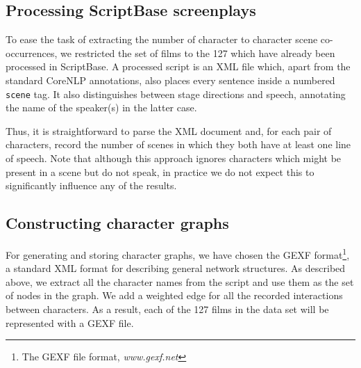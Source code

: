 \documentclass[bsc,frontabs,singlespacing,parskip, twoside]{infthesis}
\begin{document}
\subsection{Processing ScriptBase screenplays}
To ease the task of extracting the number of character to character scene co-occurrences, we restricted the set of films to the 127 which have already been processed in ScriptBase. A processed script is an XML file which, apart from the standard CoreNLP annotations, also places every sentence inside a numbered \texttt{scene} tag. It also distinguishes between stage directions and speech, annotating the name of the speaker(s) in the latter case.

Thus, it is straightforward to parse the XML document and, for each pair of characters, record the number of scenes in which they both have at least one line of speech. Note that although this approach ignores characters which might be present in a scene but do not speak, in practice we do not expect this to significantly influence any of the results.

\subsection{Constructing character graphs}
For generating and storing character graphs, we have chosen the GEXF format\footnote{The GEXF file format, \textit{www.gexf.net}}, a standard XML format for describing general network structures. As described above, we extract all the character names from the script and use them as the set of nodes in the graph. We add a weighted edge for all the recorded interactions between characters. As a result, each of the 127 films in the data set will be represented with a GEXF file.
\end{document}
